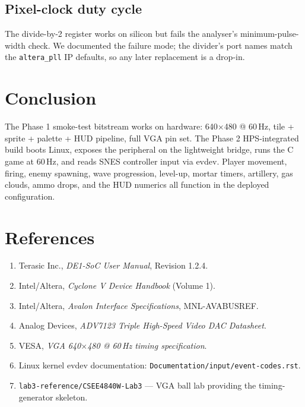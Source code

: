 \documentclass[11pt,letterpaper]{article}
\begin{document}
\subsection{Pixel-clock duty cycle}

The divide-by-2 register works on silicon but fails the analyser's
minimum-pulse-width check. We documented the failure mode; the divider's
port names match the \texttt{altera\_pll} IP defaults, so any later
replacement is a drop-in.

\section{Conclusion}

The Phase 1 smoke-test bitstream works on hardware: 640$\times$480 @ 60\,Hz,
tile + sprite + palette + HUD pipeline, full VGA pin set. The Phase 2
HPS-integrated build boots Linux, exposes the peripheral on the lightweight
bridge, runs the C game at 60\,Hz, and reads SNES controller input via
evdev. Player movement, firing, enemy spawning, wave progression, level-up,
mortar timers, artillery, gas clouds, ammo drops, and the HUD numerics all
function in the deployed configuration.

\section*{References}

\begin{enumerate}[leftmargin=*,nosep]
  \item Terasic Inc., \emph{DE1-SoC User Manual}, Revision 1.2.4.
  \item Intel/Altera, \emph{Cyclone V Device Handbook} (Volume 1).
  \item Intel/Altera, \emph{Avalon Interface Specifications}, MNL-AVABUSREF.
  \item Analog Devices, \emph{ADV7123 Triple High-Speed Video DAC Datasheet}.
  \item VESA, \emph{VGA 640$\times$480 @ 60\,Hz timing specification}.
  \item Linux kernel evdev documentation: \texttt{Documentation/input/event-codes.rst}.
  \item \texttt{lab3-reference/CSEE4840W-Lab3} --- VGA ball lab providing the timing-generator skeleton.
\end{enumerate}
\end{document}
